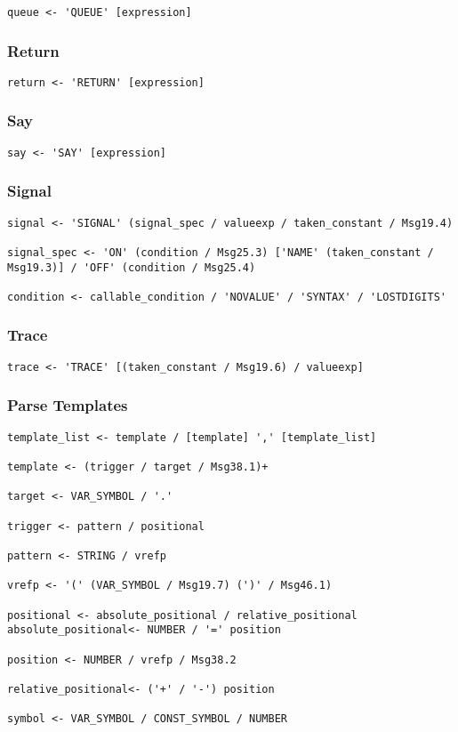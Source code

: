 \begin{verbatim}
queue <- 'QUEUE' [expression]
\end{verbatim}

\subsubsection{Return}

\begin{verbatim}
return <- 'RETURN' [expression]
\end{verbatim}

\subsubsection{Say}

\begin{verbatim}
say <- 'SAY' [expression]
\end{verbatim}

\subsubsection{Signal}

\begin{verbatim}
signal <- 'SIGNAL' (signal_spec / valueexp / taken_constant / Msg19.4)

signal_spec <- 'ON' (condition / Msg25.3) ['NAME' (taken_constant / Msg19.3)] / 'OFF' (condition / Msg25.4)

condition <- callable_condition / 'NOVALUE' / 'SYNTAX' / 'LOSTDIGITS'
\end{verbatim}

\subsubsection{Trace}

\begin{verbatim}
trace <- 'TRACE' [(taken_constant / Msg19.6) / valueexp]
\end{verbatim}

\subsubsection{Parse Templates}

\begin{verbatim}
template_list <- template / [template] ',' [template_list]

template <- (trigger / target / Msg38.1)+

target <- VAR_SYMBOL / '.'

trigger <- pattern / positional

pattern <- STRING / vrefp

vrefp <- '(' (VAR_SYMBOL / Msg19.7) (')' / Msg46.1)

positional <- absolute_positional / relative_positional absolute_positional<- NUMBER / '=' position

position <- NUMBER / vrefp / Msg38.2

relative_positional<- ('+' / '-') position

symbol <- VAR_SYMBOL / CONST_SYMBOL / NUMBER
\end{verbatim}

